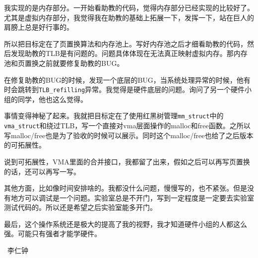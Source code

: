 我实现的是内存部分。一开始看助教的代码，觉得内存部分已经实现的比较好了。尤其是虚拟内存部分，我觉得我在助教的基础上拓展一下，发挥一下，站在巨人的肩膀上总是好行事的。

所以把目标定在了页置换算法和内存池上。写好内存池之后才细看助教的代码，然后发现助教的TLB是有问题的。问题具体体现在无法真正映射虚拟内存。那内存池和页置换之前就要修复助教的BUG。

在修复助教的BUG的时候，发现一个底层的BUG，当系统处理异常的时候，他有时会跳转到\texttt{TLB\_refilling}异常。我觉得是硬件底层的问题。询问了另一个硬件小组的同学，他也这么觉得。

事情变得神秘了起来。我就把目标定在了使用红黑树管理\texttt{mm\_struct}中的\texttt{vma\_struct}和绕过TLB，写一个直接对vma层面操作的malloc和free函数。之所以写malloc/free也是为了验收的时候可以展示。同时这个malloc/free也给了之后版本的可拓展性。

说到可拓展性，VMA里面的合并接口，我都留了出来，假如之后可以再写页置换的话，还可以再写一写。

其他方面，比如像时间安排啥的。我都没什么问题，慢慢写的，也不紧张。但是没有地方可以调试是一个问题。实验室总是不开门，写到一定程度是一定要去实验室测试代码的。所以还是希望之后实验室能多开门。

最后，这个操作系统还是极大的提高了我的视野，我才知道硬件小组的人都这么强。可能只有强者才能学硬件。

~\hfill 李仁钟
